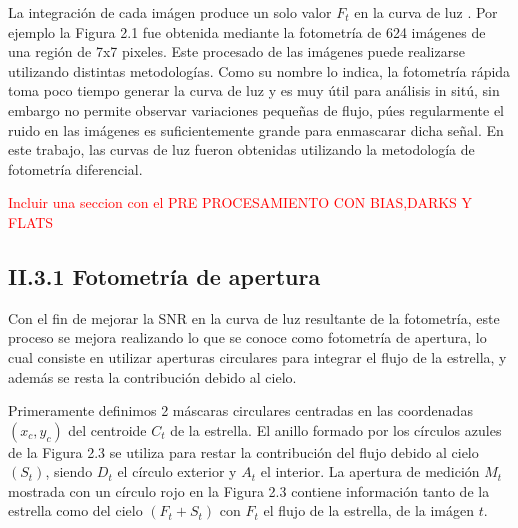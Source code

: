 La integración de cada imágen produce un solo valor $F_{t}$ en la curva de luz \cite{romanishin2006introduction}. Por ejemplo la Figura 2.1 fue obtenida mediante la fotometría de 624 imágenes de una región de 7x7 pixeles. Este procesado de las imágenes puede realizarse utilizando distintas metodologías. Como su nombre lo indica, la fotometría rápida toma poco tiempo generar la curva de luz y es muy útil para análisis in sitú, sin embargo no permite observar variaciones pequeñas de flujo, púes regularmente el ruido en las imágenes es suficientemente grande para enmascarar dicha señal. En este trabajo, las curvas de luz fueron obtenidas utilizando la metodología de fotometría diferencial.


\textcolor{red}{Incluir una seccion con el PRE PROCESAMIENTO CON BIAS,DARKS Y FLATS}

\subsection*{II.3.1 Fotometría de apertura}

Con el fin de mejorar la SNR en la curva de luz resultante de la fotometría, este proceso se mejora realizando lo que se conoce como fotometría de apertura, lo cual consiste en utilizar aperturas circulares para integrar el flujo de la estrella, y además se resta la contribución debido al cielo.

Primeramente definimos 2 máscaras circulares centradas en las coordenadas $(x_{c},y_{c})$ del centroide $ C_{t} $ de la estrella. El anillo formado por los círculos azules de la Figura 2.3 se utiliza para restar la contribución del flujo debido al cielo $(S_{t})$, siendo $D_{t}$ el círculo exterior y $A_{t}$ el interior. La apertura de medición $M_{t}$ mostrada con un círculo rojo en la Figura 2.3 contiene información tanto de la estrella como del cielo $(F_{t}+S_{t})$ con $F_{t}$ el flujo de la estrella, de la imágen $t$.


